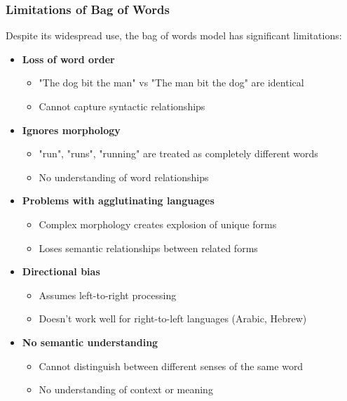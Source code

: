 \documentclass[11pt,a4paper]{article}
\theoremstyle{definition}
\theoremstyle{plain}
\theoremstyle{remark}
\begin{document}
\subsubsection{Limitations of Bag of Words}

Despite its widespread use, the bag of words model has significant limitations:

\begin{itemize}
    \item \textbf{Loss of word order}
    \begin{itemize}
        \item "The dog bit the man" vs "The man bit the dog" are identical
        \item Cannot capture syntactic relationships
    \end{itemize}
    
    \item \textbf{Ignores morphology}
    \begin{itemize}
        \item "run", "runs", "running" are treated as completely different words
        \item No understanding of word relationships
    \end{itemize}
    
    \item \textbf{Problems with agglutinating languages}
    \begin{itemize}
        \item Complex morphology creates explosion of unique forms
        \item Loses semantic relationships between related forms
    \end{itemize}
    
    \item \textbf{Directional bias}
    \begin{itemize}
        \item Assumes left-to-right processing
        \item Doesn't work well for right-to-left languages (Arabic, Hebrew)
    \end{itemize}
    
    \item \textbf{No semantic understanding}
    \begin{itemize}
        \item Cannot distinguish between different senses of the same word
        \item No understanding of context or meaning
    \end{itemize}
\end{itemize}
\end{document}

